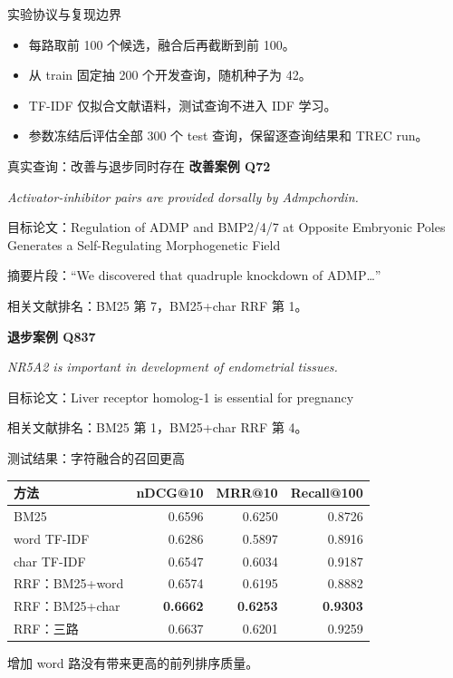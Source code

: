 \documentclass[aspectratio=169,11pt]{beamer}
\begin{document}
\begin{frame}{实验协议与复现边界}
\begin{itemize}\setlength\itemsep{0.75em}
\item 每路取前 100 个候选，融合后再截断到前 100。
\item 从 train 固定抽 200 个开发查询，随机种子为 42。
\item TF-IDF 仅拟合文献语料，测试查询不进入 IDF 学习。
\item 参数冻结后评估全部 300 个 test 查询，保留逐查询结果和 TREC run。
\end{itemize}
\end{frame}

\begin{frame}{真实查询：改善与退步同时存在}
\small
\textbf{改善案例 Q72}\par
\textit{Activator-inhibitor pairs are provided dorsally by Admpchordin.}\par\smallskip
目标论文：Regulation of ADMP and BMP2/4/7 at Opposite Embryonic Poles Generates a Self-Regulating Morphogenetic Field\par
摘要片段：``We discovered that quadruple knockdown of ADMP\ldots''\par
相关文献排名：BM25 第 7，BM25+char RRF 第 1。\par
\medskip
\textbf{退步案例 Q837}\par
\textit{NR5A2 is important in development of endometrial tissues.}\par\smallskip
目标论文：Liver receptor homolog-1 is essential for pregnancy\par
相关文献排名：BM25 第 1，BM25+char RRF 第 4。
\end{frame}

\begin{frame}{测试结果：字符融合的召回更高}
\centering
\small\renewcommand\arraystretch{1.35}
\begin{tabular}{lrrr}\toprule
方法 & nDCG@10 & MRR@10 & Recall@100\\\midrule
BM25 & 0.6596 & 0.6250 & 0.8726\\
word TF-IDF & 0.6286 & 0.5897 & 0.8916\\
char TF-IDF & 0.6547 & 0.6034 & 0.9187\\
RRF：BM25+word & 0.6574 & 0.6195 & 0.8882\\
RRF：BM25+char & \textbf{0.6662} & \textbf{0.6253} & \textbf{0.9303}\\
RRF：三路 & 0.6637 & 0.6201 & 0.9259\\\bottomrule
\end{tabular}
\vfill
\raggedright\normalsize
增加 word 路没有带来更高的前列排序质量。
\end{frame}
\end{document}
